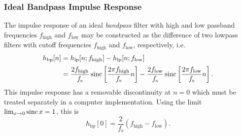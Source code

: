 \subsubsection{Ideal Bandpass Impulse Response}
The impulse response of an ideal \textit{bandpass} filter with high and low passband frequencies $ f_{\mathrm{high}} $ and $ f_{\mathrm{low}} $ may be constructed as the difference of two lowpass filters with cutoff frequencies $ f_{\mathrm{high}} $ and $ f_{\mathrm{low}} $, respectively, i.e.
\begin{align*}
    h_{\mathrm{bp}}[n] & = h_{\mathrm{lp}}[n; f_{\mathrm{high}}] - h_{\mathrm{lp}}[n; f_{\mathrm{low}}]\\[0.3ex]
    & = \frac{2 f_{\mathrm{high}}}{f_{\mathrm{s}}} \operatorname{sinc} \left[ \frac{2\pi f_{\mathrm{high}}}{f_{\mathrm{s}}}n \right] - \frac{2 f_{\mathrm{low}}}{f_{\mathrm{s}}} \operatorname{sinc} \left[ \frac{2\pi f_{\mathrm{low}}}{f_{\mathrm{s}}} n \right].
\end{align*}
This impulse response has a removable discontinuity at $ n = 0 $ which must be treated separately in a computer implementation.
Using the limit $ \lim_{x \to 0} \operatorname{sinc} x = 1 $, this is
\begin{equation*}
    h_{\mathrm{bp}}[0] = \frac{2}{f_{\mathrm{s}}}(f_{\mathrm{high}} - f_{\mathrm{low}}).
\end{equation*}

